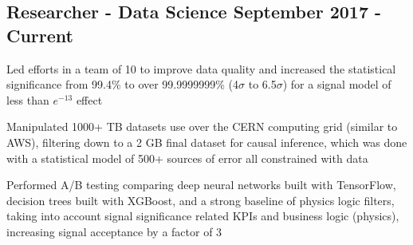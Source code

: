 \documentclass[letter,10pt]{article}
\begin{document}
\subsection{{Researcher - Data Science  \hfill September 2017 - Current}}
\begin{zitemize}
\item Led efforts in a team of 10 to improve data quality and increased the statistical significance from 99.4\% to over 99.9999999\% (4$\sigma$ to 6.5$\sigma$) for a signal model of less than $e^{-13}$ effect 
\item Manipulated 1000+ TB datasets use over the CERN computing grid (similar to AWS), filtering down to a 2 GB final dataset for causal inference, which was done with a statistical model of 500+ sources of error all constrained with data\\
\item Performed A/B testing comparing deep neural networks built with TensorFlow, decision trees built with XGBoost, 
and a strong baseline of physics logic filters, taking into account signal significance related KPIs and business logic (physics), increasing signal acceptance by a factor of 3 

\end{zitemize}
\end{document}
